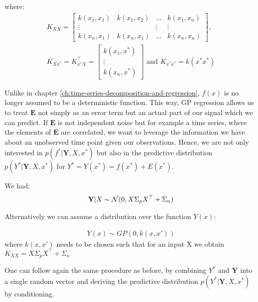 where:
\begin{gather*}
    K_{XX} =
    \begin{bmatrix}
        k(x_1, x_1) & k(x_1, x_2) & \dots & k(x_1, x_n)\\
        \vdots  &  & \vdots  & \vdots \\
        k(x_n, x_1)  & k(x_n, x_1) & \dots  & k(x_n, x_n)
    \end{bmatrix}, \\
    K_{Xx^{\ast}} = K_{x^{\ast}X}^{\top} =
    \begin{bmatrix}
        k(x_1, x^{\ast}) \\
        \vdots \\
        k(x_n,  x^{\ast})
    \end{bmatrix} \text{ and }
    K_{x^{\ast}x^{\ast}} = k(x^{\ast}x^{\ast})
\end{gather*}

Unlike in chapter \ref{ch:time-series-decomposition-and-regression}, $f(x)$ is no longer assumed to be a
deterministic function. This way, GP regression allows us to treat $\mathbf{E}$ not simply as an error term but an actual part of
our signal which we can predict. If $\mathbf{E}$ is not independent noise but for example a time series, where
the elements of $\mathbf{E}$ are correlated, we want to leverage the information we have about an unobserved
time point given our observations.
Hence, we are not only interested in $p(f^{\ast} | \mathbf{Y}, X, x^{\ast})$ but also
in the predictive distribution $p(Y^{\ast} | \mathbf{Y}, X, x^{\ast})$ for $Y^{\ast} = Y(x^{\ast}) = f(x^{\ast}) + E(x^{\ast})$.

We had:
\begin{gather*}
    \mathbf{Y}|X \sim \operatorname{\mathcal{N}}(0,  X \Sigma_p X^{\top} + \Sigma_n) \\
\end{gather*}

Alternatively we can assume a distribution over the function $Y(x)$:

\begin{gather*}
    Y(x) \sim GP(0, k(x, x'))
\end{gather*}
where $k(x,x')$ needs to be chosen such that for an input X we obtain $K_{XX} =  X \Sigma_p X^{\top} + \Sigma_n$

One can follow again the same procedure as before, by combining $Y^{\ast}$ and $\mathbf{Y}$ into a single random vector
and deriving the predictive distribution $p(Y^{\ast} | \mathbf{Y}, X, x^{\ast})$ by conditioning.

